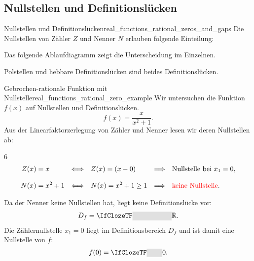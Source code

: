 \subsection{Nullstellen und Definitionslücken}
\label{subsec:real_functions_poles}
\begin{DefinitionBox}{Nullstellen und Definitionslücken}{real_functions_rational_zeros_and_gaps}
  \label{def:real_functions_removable_gap}
  \label{def:real_functions_pole}
  Die Nullstellen von Zähler $Z$ und Nenner $N$ erlauben folgende Einteilung:
  \begin{center}
  \end{center}
  Das folgende Ablaufdiagramm zeigt die Unterscheidung im Einzelnen.
  \begin{center}
  \end{center}
  Polstellen und hebbare Definitionslücken sind beides Definitionslücken.
\end{DefinitionBox}

\begin{ExampleBox}{Gebrochen-rationale Funktion mit Nullstelle}{real_functions_rational_zero_example}
  Wir untersuchen die Funktion $f(x)$ auf Nullstellen und Definitionslücken.
  \[
    f(x)=\frac{x}{x^2+1}.
  \]
  Aus der Linearfaktorzerlegung von Zähler und Nenner lesen wir deren Nullstellen ab:
  \begin{ClozeArea}[32]{6}
    \[
      \begin{alignedat}{3}
        Z(x)&=x
          &\quad\Longleftrightarrow\quad& Z(x)=(x-0)
          &\quad\Longrightarrow\quad& \text{Nullstelle bei }x_1=0,\\[0.8em]
        N(x)&=x^2+1
          &\quad\Longleftrightarrow\quad& N(x)=x^2+1\ge1
          &\quad\Longrightarrow\quad& \textcolor{red}{\text{keine Nullstelle}}.
      \end{alignedat}
    \]
  \end{ClozeArea}
  \noindent
  \begin{minipage}[c]{0.45\linewidth}
    Da der Nenner keine Nullstellen hat, liegt keine Definitionslücke vor:
    \[
      D_f=\Cloze{2cm}{\R}.
    \]
    Die Zählernullstelle $x_1=0$ liegt im Definitionsbereich $D_f$ und ist damit
    eine Nullstelle von $f$:
    \[
      f(0)=\Cloze{0.8cm}{0}.
    \]
  \end{minipage}\hfill
  \begin{minipage}[c]{0.52\linewidth}
    \centering
  \end{minipage}
\end{ExampleBox}


